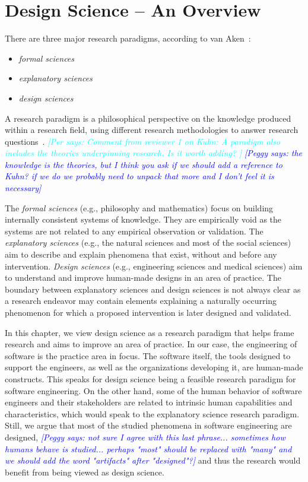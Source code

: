 \documentclass[graybox]{svmult}
\newcommand{\peggy}[1]{\textcolor{blue}{{\it [Peggy says: #1]}}}
\newcommand{\per}[1]{\textcolor{cyan}{{\it [Per says: #1]}}}
\newcommand{\peggy}[1]{}
\newcommand{\per}[1]{}
\begin{document}
\section{Design Science -- An Overview}
\label{sec:overview}

There are three major research paradigms, according to van Aken~\cite{van_aken_management_2004}:
\begin{itemize}
\item \emph{formal sciences} %
\item \emph{explanatory sciences} %
\item \emph{design sciences}%
\end{itemize}

A research paradigm is a philosophical perspective on the knowledge produced within a research field, using different research methodologies to answer research questions~\cite{van_aken_management_2004}. \per{Comment from reviewer 1 on Kuhn: A  paradigm  also includes the theories underpinning research. Is it worth adding? }
\peggy{the knowledge is the theories, but I think you ask if we should add a reference to Kuhn? if we do we probably need to unpack that more and I don't feel it is necessary}

The \emph{formal sciences} (e.g., philosophy and mathematics) focus on building internally consistent systems of knowledge. They are empirically void as the systems are not related to any empirical observation or validation. The \emph{explanatory sciences} (e.g., the natural sciences and most of the social sciences) aim to describe and explain phenomena that exist, without and before any intervention. \emph{Design sciences} (e.g., engineering sciences and medical sciences) aim to understand and improve human-made designs in an area of practice. The boundary between explanatory sciences and design sciences is not always clear as a research endeavor may contain elements explaining a naturally occurring phenomenon for which a proposed intervention is later designed and validated. 

In this chapter, we view design science as a research paradigm that helps frame research and aims to improve an area of practice. In our case, the engineering of software is the practice area in focus. The software itself, the tools designed to support the engineers, as well as the organizations developing it, are human-made constructs. This speaks for design science being a feasible research paradigm for software engineering. On the other hand, some of the human behavior of software engineers and their stakeholders are related to intrinsic human capabilities and characteristics, which would speak to the explanatory science research paradigm. Still, we argue that most of the studied phenomena in software engineering are designed,
\peggy{not sure I agree with this last phrase... sometimes how humans behave is studied... perhaps "most" should be replaced with "many" and we should add the word "artifacts" after "designed"?} and thus the research would benefit from being viewed as design science.
\end{document}
